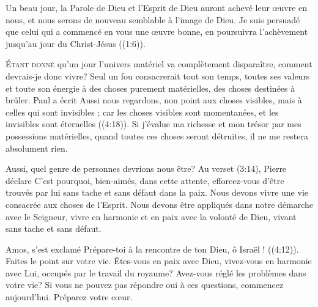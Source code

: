 Un beau jour, la Parole de Dieu et l'Esprit de Dieu auront achevé leur \oe{}uvre
 en nous, et nous serons de nouveau semblable à l'image de Dieu.
 \Og Je suis persuadé que celui qui a commencé en vous une \oe{}uvre bonne,
 en poursuivra l'achèvement jusqu'au jour du Christ-Jésus \Fg{}
 ((1:6)).

\dvrule






\lettrine{É}{tant donné} qu'un jour l'univers matériel va complètement
 disparaître, comment devrais-je donc vivre? Seul un fou consacrerait
 tout son temps, toutes ses valeurs et toute son énergie à des choses purement
 matérielles, des choses destinées à brûler. Paul a écrit\frcolon{} 
 \Og Aussi nous regardons, non point aux choses visibles,
 mais à celles qui sont invisibles ; car les choses visibles sont momentanées,
 et les invisibles sont éternelles \Fg{} ((4:18)).
 Si j'évalue ma richesse et mon trésor par mes possessions matérielles,
 quand toutes ces choses seront détruites, il ne me restera absolument rien.

Aussi, quel genre de personnes devrions nous être? Au verset
 (3:14),
 Pierre déclare\frcolon{} 
 \Og C'est pourquoi, bien-aimés, dans cette attente,
 efforcez-vous d'être trouvés par lui sans tache et sans défaut
 dans la paix. \Fg{}
 Nous devons vivre une vie consacrée aux choses de l'Esprit.
 Nous devons être appliqués dans notre démarche avec le Seigneur,
 vivre en harmonie et en paix avec la volonté de Dieu,
 vivant sans tache et sans défaut.


Amos, s'est exclamé\frcolon{} 
 \Og Prépare-toi à la rencontre de ton Dieu, ô Israël ! \Fg{}
 ((4:12)).
 Faites le point sur votre vie. Êtes-vous en paix avec Dieu,
 vivez-vous en harmonie avec Lui, occupés par le travail du royaume?
 Avez-vous réglé les problèmes dans votre vie? Si vous ne pouvez pas répondre
 \Og oui \Fg{} à ces questions, commencez aujourd'hui. Préparez votre c\oe{}ur.

